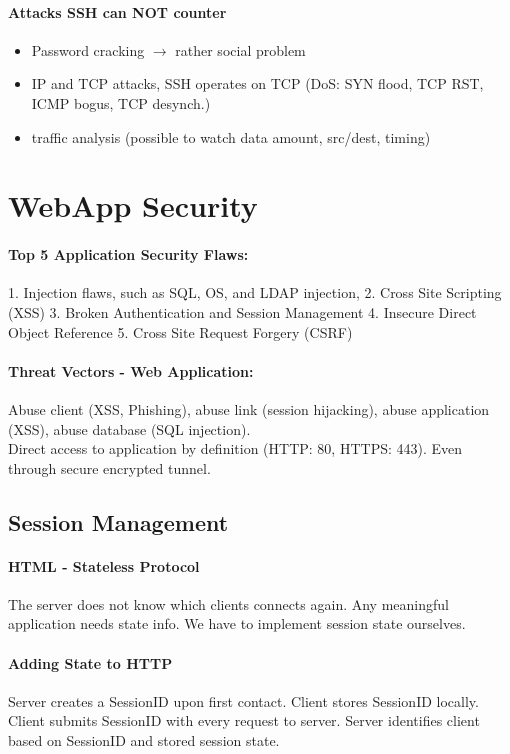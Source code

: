 \paragraph{Attacks SSH can NOT counter}
\begin{itemize}
\item Password cracking $\to$ rather social problem
\item IP and TCP attacks, SSH operates on TCP (DoS: SYN flood, TCP RST, ICMP bogus, TCP desynch.)
\item traffic analysis (possible to watch data amount, src/dest, timing)
\end{itemize}

\section{WebApp Security}
\paragraph{Top 5 Application Security Flaws:} 1. Injection flaws, such as SQL, OS, and LDAP injection, 2. Cross Site Scripting (XSS)
3. Broken Authentication and Session Management
4. Insecure Direct Object Reference
5. Cross Site Request Forgery (CSRF)

\paragraph{Threat Vectors - Web Application:} Abuse client (XSS, Phishing), abuse link (session hijacking), abuse application (XSS), abuse database (SQL injection). \\
Direct access to application by definition (HTTP: 80, HTTPS: 443). Even through secure encrypted tunnel.

\subsection{Session Management}

\paragraph{HTML - Stateless Protocol} The server does not know which clients connects again. Any meaningful application needs state info. We have to implement session state ourselves.

\paragraph{Adding State to HTTP} Server creates a SessionID upon first contact. Client stores SessionID locally. Client submits SessionID with every request to server. Server identifies client based on SessionID and stored session state.

